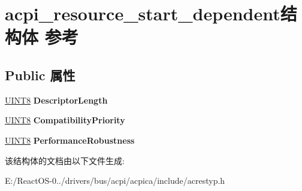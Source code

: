 \hypertarget{structacpi__resource__start__dependent}{}\section{acpi\+\_\+resource\+\_\+start\+\_\+dependent结构体 参考}
\label{structacpi__resource__start__dependent}
\subsection*{Public 属性}
\begin{DoxyCompactItemize}
\item 
\mbox{\label{structacpi__resource__start__dependent_a8894e749f0e81e8e836c20c7b5bd643b}} 
\hyperlink{_processor_bind_8h_ab27e9918b538ce9d8ca692479b375b6a}{U\+I\+N\+T8} {\bfseries Descriptor\+Length}
\item 
\mbox{\label{structacpi__resource__start__dependent_a72c96f890d2cda5c3e1adb58b8a87b1e}} 
\hyperlink{_processor_bind_8h_ab27e9918b538ce9d8ca692479b375b6a}{U\+I\+N\+T8} {\bfseries Compatibility\+Priority}
\item 
\mbox{\label{structacpi__resource__start__dependent_abf5011ef09fdca8817137dfbba69f082}} 
\hyperlink{_processor_bind_8h_ab27e9918b538ce9d8ca692479b375b6a}{U\+I\+N\+T8} {\bfseries Performance\+Robustness}
\end{DoxyCompactItemize}


该结构体的文档由以下文件生成\+:\begin{DoxyCompactItemize}
\item 
E\+:/\+React\+O\+S-\/0../drivers/bus/acpi/acpica/include/acrestyp.\+h\end{DoxyCompactItemize}
